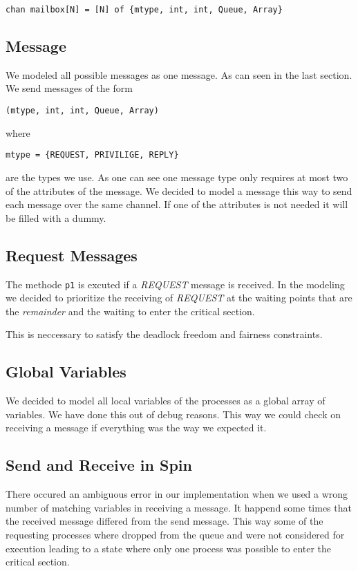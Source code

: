 \documentclass{llncs}
\begin{document}
\begin{lstlisting}
chan mailbox[N] = [N] of {mtype, int, int, Queue, Array}
\end{lstlisting}

\subsection{Message}

We modeled all possible messages as one message. As can seen in
the last section. We send messages of the form
\begin{lstlisting}
(mtype, int, int, Queue, Array)
\end{lstlisting}
where
\begin{lstlisting}
mtype = {REQUEST, PRIVILIGE, REPLY}
\end{lstlisting}
are the types we use. As one can see one message type only requires
at most two of the attributes of the message. We decided to model a
message this way to send each message over the same channel. If one of
the attributes is not needed it will be filled with a dummy.


\subsection{Request Messages}

The methode \lstinline|p1| is excuted if a \emph{REQUEST} message is received.
In the modeling we decided to prioritize the receiving of \emph{REQUEST} at the
waiting points that are the \emph{remainder} and the waiting to enter the critical section.

This is neccessary to satisfy the deadlock freedom and fairness constraints.

\subsection{Global Variables}

We decided to model all local variables of the processes as a global array of variables.
We have done this out of debug reasons. This way we could check on receiving a message
if everything was the way we expected it.

\subsection{Send and Receive in Spin}

There occured an ambiguous error in our implementation when we used a wrong number of matching
variables in receiving a message. It happend some times that the received message differed from the
send message. This way some of the requesting processes where dropped from the queue and were not considered
for execution leading to a state where only one process was possible to enter the critical section.
\end{document}
